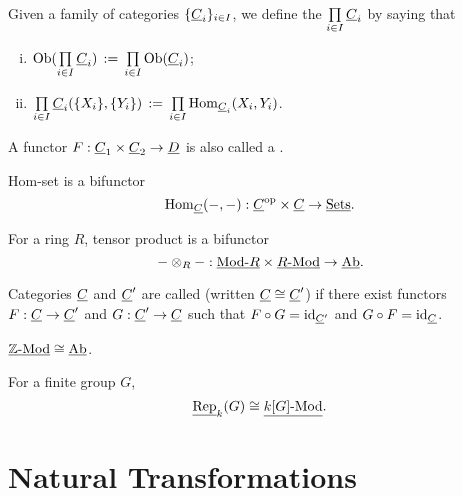 \begin{definition*}
	Given a family of categories \( \{\underline{C}_i\}_{i \in I} \), we define the  \( \prod\limits_{i \in I} \underline{C}_i \) by saying that
	\begin{enumerate}[(i)]
		\item \( \operatorname{Ob}(\prod\limits_{i \in I} \underline{C}_i) \,:=\, \prod\limits_{i \in I} \operatorname{Ob}(\underline{C}_i) \);
		\item \( \prod\limits_{i \in I} \underline{C}_i(\{X_i\}, \{Y_i\}) \,:=\, \prod\limits_{i \in I} \operatorname{Hom}_{\underline{C}_i}(X_i, Y_i) \).
	\end{enumerate}
\end{definition*}

\begin{definition*}
	A functor \( F: \underline{C}_1 \times \underline{C}_2 \to \underline{D} \) is also called a .
\end{definition*}

\begin{examples*}
	\item Hom-set is a bifunctor
		\[
			\operatorname{Hom}_{\underline{C}}(-, -): \underline{C}^\mathrm{op} \times \underline{C} \to \underline{\mathrm{Sets}}.
		\]
	\item For a ring \( R \), tensor product is a bifunctor
		\[
			- \otimes_R -: \underline{\mathrm{Mod}\text{-}R} \times \underline{R\text{-}\mathrm{Mod}} \to \underline{\mathrm{Ab}}.
		\]
\end{examples*}

\begin{definition*}
	Categories \( \underline{C} \) and \( \underline{C}' \) are called  (written \( \underline{C} \cong \underline{C}' \)) if there exist functors \( F: \underline{C} \to \underline{C}' \) and \( G: \underline{C}' \to \underline{C} \) such that \( F \circ G = \mathrm{id}_{\underline{C}'} \) and \( G \circ F = \mathrm{id}_{\underline{C}} \).
\end{definition*}

\begin{examples*}
	\item \( \underline{\mathbb{Z}\text{-}\mathrm{Mod}} \cong \underline{\mathrm{Ab}} \).
	\item For a finite group \( G \),
		\[
			\underline{\mathrm{Rep}}_k(G) \cong \underline{k[G]\text{-}\mathrm{Mod}}.
		\]
\end{examples*}

\section{Natural Transformations}

